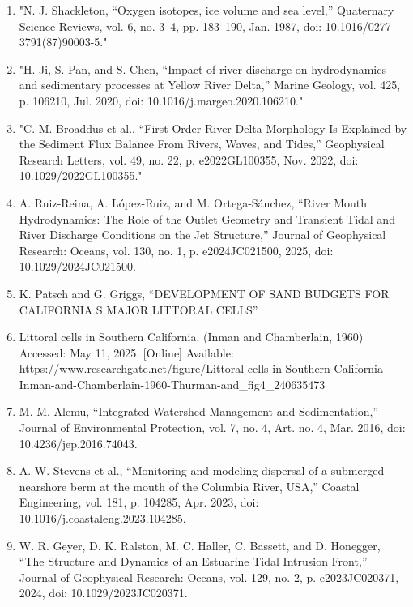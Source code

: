 \documentclass{article}
\begin{document}
\begin{enumerate}
    \item{"N. J. Shackleton, “Oxygen isotopes, ice volume and sea level,” Quaternary Science Reviews, vol. 6, no. 3–4, pp. 183–190, Jan. 1987, doi: 10.1016/0277-3791(87)90003-5."}

    \item{"H. Ji, S. Pan, and S. Chen, “Impact of river discharge on hydrodynamics and sedimentary processes at Yellow River Delta,” Marine Geology, vol. 425, p. 106210, Jul. 2020, doi: 10.1016/j.margeo.2020.106210."}

    \item{"C. M. Broaddus et al., “First‐Order River Delta Morphology Is Explained by the Sediment Flux Balance From Rivers, Waves, and Tides,” Geophysical Research Letters, vol. 49, no. 22, p. e2022GL100355, Nov. 2022, doi: 10.1029/2022GL100355."}

    \item{A. Ruiz-Reina, A. López-Ruiz, and M. Ortega-Sánchez, “River Mouth Hydrodynamics: The Role of the Outlet Geometry and Transient Tidal and River Discharge Conditions on the Jet Structure,” Journal of Geophysical Research: Oceans, vol. 130, no. 1, p. e2024JC021500, 2025, doi: 10.1029/2024JC021500.}

    \item{K. Patsch and G. Griggs, “DEVELOPMENT OF SAND BUDGETS FOR CALIFORNIA S MAJOR LITTORAL CELLS”.}

    \item{Littoral cells in Southern California. (Inman and Chamberlain, 1960) Accessed: May 11, 2025. [Online] Available: https://www.researchgate.net/figure/Littoral-cells-in-Southern-California-Inman-and-Chamberlain-1960-Thurman-and_fig4_240635473}


    \item{M. M. Alemu, “Integrated Watershed Management and Sedimentation,” Journal of Environmental Protection, vol. 7, no. 4, Art. no. 4, Mar. 2016, doi: 10.4236/jep.2016.74043.}

    \item{A. W. Stevens et al., “Monitoring and modeling dispersal of a submerged nearshore berm at the mouth of the Columbia River, USA,” Coastal Engineering, vol. 181, p. 104285, Apr. 2023, doi: 10.1016/j.coastaleng.2023.104285.}

    \item{W. R. Geyer, D. K. Ralston, M. C. Haller, C. Bassett, and D. Honegger, “The Structure and Dynamics of an Estuarine Tidal Intrusion Front,” Journal of Geophysical Research: Oceans, vol. 129, no. 2, p. e2023JC020371, 2024, doi: 10.1029/2023JC020371.}


\end{enumerate}
\end{document}

